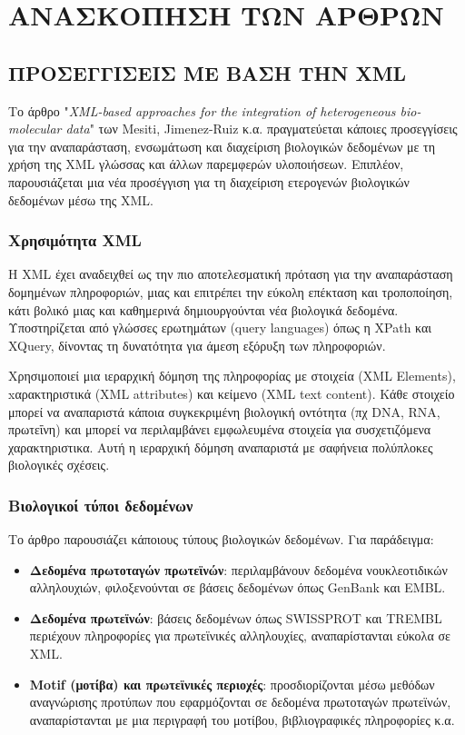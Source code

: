 \chapter{ΑΝΑΣΚΟΠΗΣΗ ΤΩΝ ΑΡΘΡΩΝ}

\section{ΠΡΟΣΕΓΓΙΣΕΙΣ ΜΕ ΒΑΣΗ ΤΗΝ XML}
    Το άρθρο "\textit{XML-based approaches for the integration of heterogeneous bio-molecular data}" των Mesiti, Jimenez-Ruiz κ.α. πραγματεύεται κάποιες προσεγγίσεις για την αναπαράσταση, ενσωμάτωση και διαχείριση βιολογικών δεδομένων με τη χρήση της XML γλώσσας και άλλων παρεμφερών υλοποιήσεων.
    Επιπλέον, παρουσιάζεται μια νέα προσέγγιση για τη διαχείριση ετερογενών βιολογικών δεδομένων μέσω της XML. \cite{XMLbasedApproaches}
    
    \subsection{Χρησιμότητα XML}
        Η XML έχει αναδειχθεί ως την πιο αποτελεσματική πρόταση για την αναπαράσταση δομημένων πληροφοριών, μιας και επιτρέπει την εύκολη επέκταση και τροποποίηση, κάτι βολικό μιας και καθημερινά δημιουργούνται νέα βιολογικά δεδομένα.
        Υποστηρίζεται από γλώσσες ερωτημάτων (query languages) όπως η XPath και XQuery, δίνοντας τη δυνατότητα για άμεση εξόρυξη των πληροφοριών.

        Χρησιμοποιεί μια ιεραρχική δόμηση της πληροφορίας με στοιχεία (XML Elements), xαρακτηριστικά (XML attributes) και κείμενο (XML text content).
        Κάθε στοιχείο μπορεί να αναπαριστά κάποια συγκεκριμένη βιολογική οντότητα (πχ DNA, RNA, πρωτεΐνη) και μπορεί να περιλαμβάνει εμφωλευμένα στοιχεία για συσχετιζόμενα χαρακτηριστικα.
        Αυτή η ιεραρχική δόμηση αναπαριστά με σαφήνεια πολύπλοκες βιολογικές σχέσεις.


    \subsection{Βιολογικοί τύποι δεδομένων}
        Το άρθρο παρουσιάζει κάποιους τύπους βιολογικών δεδομένων. Για παράδειγμα:
    \begin{itemize}[label={\tiny \blacksquare}]
        \vspace{-10pt}
        \item \textbf{Δεδομένα πρωτοταγών πρωτεϊνών}: περιλαμβάνουν δεδομένα νουκλεοτιδικών αλληλουχιών, φιλοξενούνται σε βάσεις δεδομένων όπως GenBank και EMBL.
        \item \textbf{Δεδομένα πρωτεϊνών}: βάσεις δεδομένων όπως SWISSPROT και TREMBL περιέχουν πληροφορίες για πρωτεϊνικές αλληλουχίες, αναπαρίστανται εύκολα σε XML.
        \item \textbf{Motif (μοτίβα) και πρωτεϊνικές περιοχές}: προσδιορίζονται μέσω μεθόδων αναγνώρισης προτύπων που εφαρμόζονται σε δεδομένα πρωτοταγών πρωτεϊνών, αναπαρίστανται με μια περιγραφή του μοτίβου, βιβλιογραφικές πληροφορίες κ.α.
    \end{itemize}


